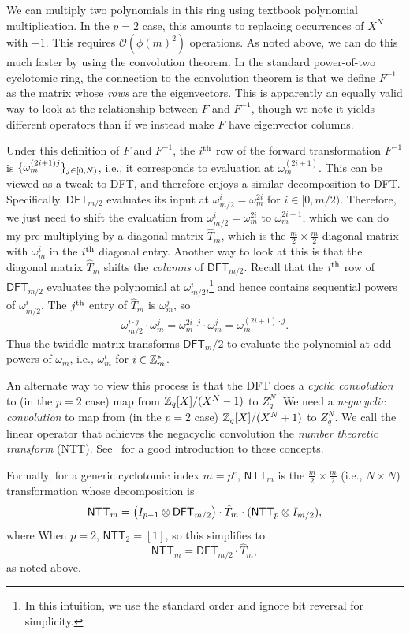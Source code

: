 \documentclass[../fheimpl.tex]{subfiles}
\begin{document}
We can multiply two polynomials in this ring using textbook polynomial multiplication. In the $p=2$ case, this amounts to replacing occurrences of $X^N$ with $-1$. This requires $\mathcal{O}(\phi(m)^2)$ operations. As noted above, we can do this much faster by using the convolution theorem. In the standard power-of-two cyclotomic ring, the connection to the convolution theorem is that we define $F^{-1}$ as the matrix whose \emph{rows} are the eigenvectors. This is apparently an equally valid way to look at the relationship between $F$ and $F^{-1}$, though we note it yields different operators than if we instead make $F$ have eigenvector columns.

Under this definition of $F$ and $F^{-1}$, the $i\th$ row of the forward transformation $F^{-1}$ is $\set{\omega_m^{(2i+1)j}}_{j\in[0,N)}$, i.e., it corresponds to evaluation at $\omega_m^{(2i+1)}$. This can be viewed as a tweak to DFT, and therefore enjoys a similar decomposition to DFT. Specifically, $\mathsf{DFT}_{m/2}$ evaluates its input at $\omega_{m/2}^i=\omega_m^{2i}$ for $i\in[0,{m/2})$. Therefore, we just need to shift the evaluation from $\omega_{m/2}^i=\omega_m^{2i}$ to $\omega_m^{2i+1}$, which we can do my pre-multiplying by a diagonal matrix $\hat{T}_m$, which is the $\frac{m}{2}\times\frac{m}{2}$ diagonal matrix with $\omega_m^i$ in the $i\th$ diagonal entry. Another way to look at this is that the diagonal matrix $\hat{T}_m$ shifts the \emph{columns} of $\mathsf{DFT}_{m/2}$. Recall that the $i\th$ row of $\mathsf{DFT}_{m/2}$ evaluates the polynomial at $\omega_{m/2}^i$,\footnote{In this intuition, we use the standard order and ignore bit reversal for simplicity.} and hence contains sequential powers of $\omega_{m/2}^i$. The $j\th$ entry of $\hat{T}_m$ is $\omega_m^j$, so
\[\omega_{m/2}^{i\cdot j}\cdot \omega_m^j = \omega_{m}^{2i\cdot j}\cdot \omega_m^j = \omega_m^{(2i+1)\cdot j}.\]
Thus the twiddle matrix transforms $\mathsf{DFT}_m/2$ to evaluate the polynomial at odd powers of $\omega_m$, i.e., $\omega_m^i$ for $i\in\Z_m^*$.

An alternate way to view this process is that the DFT does a \emph{cyclic convolution} to (in the $p=2$ case) map from $\Z_q[X]/(X^N-1)$ to $Z_q^{N}$. We need a \emph{negacyclic convolution} to map from (in the $p=2$ case) $\Z_q[X]/(X^N+1)$ to $Z_q^{N}$. We call the linear operator that achieves the negacyclic convolution the \emph{number theoretic transform} (NTT).
See~\cite{cryptoeprint:2024/585} for a good introduction to these concepts.

Formally, for a generic cyclotomic index $m=p^e$, $\mathsf{NTT}_m$ is the $\frac{m}{2}\times\frac{m}{2}$ (i.e., $N\times N$) transformation whose decomposition is
\[\mathsf{NTT}_m = \parens*{I_{p-1}\otimes \mathsf{DFT}_{m/2}}\cdot \hat{T}_m\cdot (\mathsf{NTT}_p\otimes I_{m/2}),\]
where 
When $p=2$, $\mathsf{NTT}_2 = [1]$, so this simplifies to 
\[\mathsf{NTT}_m = \mathsf{DFT}_{m/2}\cdot \hat{T}_m,\]
as noted above.
\end{document}

